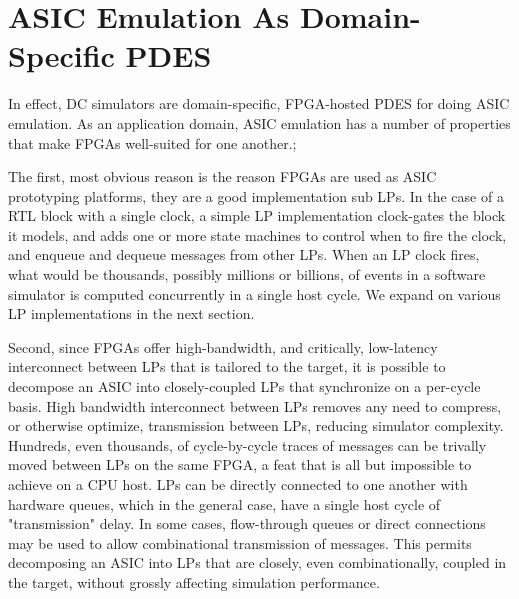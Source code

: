 \section{ASIC Emulation As Domain-Specific PDES}

In effect, DC simulators are domain-specific, FPGA-hosted PDES for doing ASIC emulation.
As an application domain, ASIC emulation has a number of properties that make FPGAs well-suited for one another.;

The first, most obvious reason is the reason FPGAs are used as ASIC prototyping
platforms, they are a good implementation sub LPs. In the case of a RTL block with a single clock, a
simple LP implementation clock-gates the block it models, and adds one or more state
machines to control when to fire the clock, and enqueue and dequeue messages
from other LPs. When an LP clock fires, what would be thousands, possibly
millions or billions, of events in a software simulator is computed
concurrently in a single host cycle. We expand on various LP implementations in
the next section.

Second, since FPGAs offer high-bandwidth, and critically, low-latency
interconnect between LPs that is tailored to the target, it is possible to
decompose an ASIC into closely-coupled LPs that synchronize on a per-cycle
basis. High bandwidth interconnect between LPs removes any need to compress, or
otherwise optimize, transmission between LPs, reducing simulator complexity.
Hundreds, even thousands, of cycle-by-cycle traces of messages can be trivally
moved between LPs on the same FPGA, a feat that is all but impossible to
achieve on a CPU host. LPs can be directly connected to one another with
hardware queues, which in the general case, have a single host cycle of
"transmission" delay. In some cases, flow-through queues or direct connections
may be used to allow combinational transmission of messages. This permits
decomposing an ASIC into LPs that are closely, even combinationally, coupled in
the target, without grossly affecting simulation performance.














